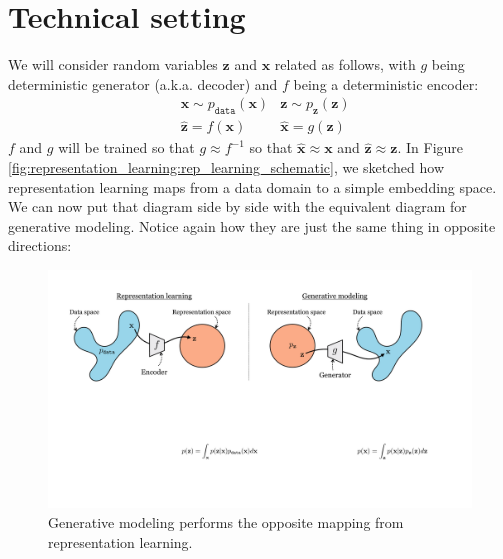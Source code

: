 \section{Technical setting}
We will consider random variables $\mathbf{z}$ and $\mathbf{x}$ related as follows, with $g$ being deterministic generator (a.k.a. decoder) and $f$ being a deterministic encoder:
\begin{align}
    &\mathbf{x} \sim p_{\texttt{data}}(\mathbf{x}) &\mathbf{z} \sim p_{\mathbf{z}}(\mathbf{z}) \\
    &\hat{\mathbf{z}} = f(\mathbf{x}) &\hat{\mathbf{x}} = g(\mathbf{z})
\end{align}
$f$ and $g$ will be trained so that $g \approx f^{-1}$ so that $\hat{\mathbf{x}} \approx \mathbf{x}$ and $\hat{\mathbf{z}} \approx \mathbf{z}$. In Figure \ref{fig:representation_learning:rep_learning_schematic}, we sketched how representation learning maps from a data domain to a simple embedding space. We can now put that diagram side by side with the equivalent diagram for generative modeling. Notice again how they are just the same thing in opposite directions:
\begin{figure}[h!]
    \centering
    \includegraphics[width=1.0\linewidth]{./figures/generative_modeling_and_representation_learning/genrep_schematic.pdf}
    \caption{Generative modeling performs the opposite mapping from representation learning.}
    \label{fig:generative_modeling_and_representation_learning:genrep_schematic}
\end{figure}

